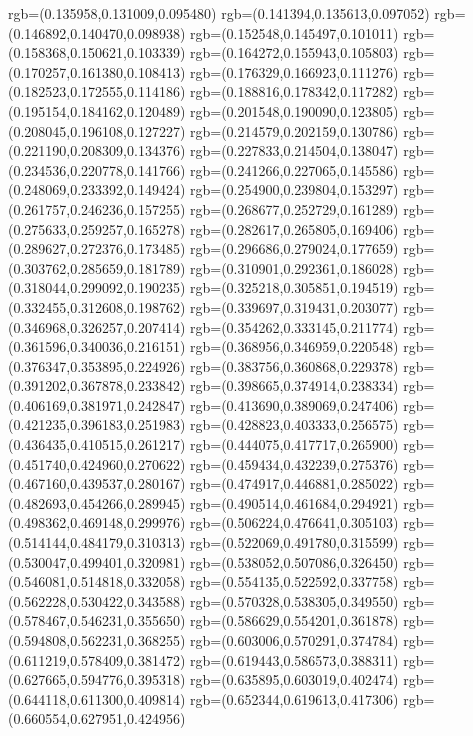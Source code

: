 {{{			rgb=(0.135958,0.131009,0.095480)
			rgb=(0.141394,0.135613,0.097052)
			rgb=(0.146892,0.140470,0.098938)
			rgb=(0.152548,0.145497,0.101011)
			rgb=(0.158368,0.150621,0.103339)
			rgb=(0.164272,0.155943,0.105803)
			rgb=(0.170257,0.161380,0.108413)
			rgb=(0.176329,0.166923,0.111276)
			rgb=(0.182523,0.172555,0.114186)
			rgb=(0.188816,0.178342,0.117282)
			rgb=(0.195154,0.184162,0.120489)
			rgb=(0.201548,0.190090,0.123805)
			rgb=(0.208045,0.196108,0.127227)
			rgb=(0.214579,0.202159,0.130786)
			rgb=(0.221190,0.208309,0.134376)
			rgb=(0.227833,0.214504,0.138047)
			rgb=(0.234536,0.220778,0.141766)
			rgb=(0.241266,0.227065,0.145586)
			rgb=(0.248069,0.233392,0.149424)
			rgb=(0.254900,0.239804,0.153297)
			rgb=(0.261757,0.246236,0.157255)
			rgb=(0.268677,0.252729,0.161289)
			rgb=(0.275633,0.259257,0.165278)
			rgb=(0.282617,0.265805,0.169406)
			rgb=(0.289627,0.272376,0.173485)
			rgb=(0.296686,0.279024,0.177659)
			rgb=(0.303762,0.285659,0.181789)
			rgb=(0.310901,0.292361,0.186028)
			rgb=(0.318044,0.299092,0.190235)
			rgb=(0.325218,0.305851,0.194519)
			rgb=(0.332455,0.312608,0.198762)
			rgb=(0.339697,0.319431,0.203077)
			rgb=(0.346968,0.326257,0.207414)
			rgb=(0.354262,0.333145,0.211774)
			rgb=(0.361596,0.340036,0.216151)
			rgb=(0.368956,0.346959,0.220548)
			rgb=(0.376347,0.353895,0.224926)
			rgb=(0.383756,0.360868,0.229378)
			rgb=(0.391202,0.367878,0.233842)
			rgb=(0.398665,0.374914,0.238334)
			rgb=(0.406169,0.381971,0.242847)
			rgb=(0.413690,0.389069,0.247406)
			rgb=(0.421235,0.396183,0.251983)
			rgb=(0.428823,0.403333,0.256575)
			rgb=(0.436435,0.410515,0.261217)
			rgb=(0.444075,0.417717,0.265900)
			rgb=(0.451740,0.424960,0.270622)
			rgb=(0.459434,0.432239,0.275376)
			rgb=(0.467160,0.439537,0.280167)
			rgb=(0.474917,0.446881,0.285022)
			rgb=(0.482693,0.454266,0.289945)
			rgb=(0.490514,0.461684,0.294921)
			rgb=(0.498362,0.469148,0.299976)
			rgb=(0.506224,0.476641,0.305103)
			rgb=(0.514144,0.484179,0.310313)
			rgb=(0.522069,0.491780,0.315599)
			rgb=(0.530047,0.499401,0.320981)
			rgb=(0.538052,0.507086,0.326450)
			rgb=(0.546081,0.514818,0.332058)
			rgb=(0.554135,0.522592,0.337758)
			rgb=(0.562228,0.530422,0.343588)
			rgb=(0.570328,0.538305,0.349550)
			rgb=(0.578467,0.546231,0.355650)
			rgb=(0.586629,0.554201,0.361878)
			rgb=(0.594808,0.562231,0.368255)
			rgb=(0.603006,0.570291,0.374784)
			rgb=(0.611219,0.578409,0.381472)
			rgb=(0.619443,0.586573,0.388311)
			rgb=(0.627665,0.594776,0.395318)
			rgb=(0.635895,0.603019,0.402474)
			rgb=(0.644118,0.611300,0.409814)
			rgb=(0.652344,0.619613,0.417306)
			rgb=(0.660554,0.627951,0.424956)
}}}
